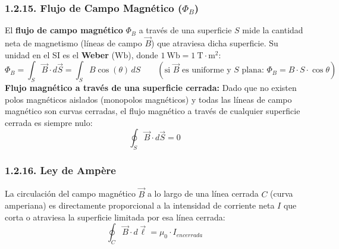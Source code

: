 \subsubsection{1.2.15. Flujo de Campo Magnético ($\Phi_B$)}
\begin{definicion}
El \textbf{flujo de campo magnético} $\Phi_B$ a través de una superficie $S$ mide la cantidad neta de magnetismo (líneas de campo $\vec{B}$) que atraviesa dicha superficie. Su unidad en el SI es el \textbf{Weber} ($\si{\weber}$), donde $1\ \si{\weber} = 1\ \si{\tesla\cdot\meter\squared}$:
\begin{equation}
    \Phi_B = \int_S \vec{B} \cdot d\vec{S} = \int_S B \cos(\theta)\, dS \qquad \left(\text{si }\vec{B}\text{ es uniforme y }S\text{ plana: }\Phi_B = B \cdot S \cdot \cos\theta\right)
\end{equation}
\textbf{Flujo magnético a través de una superficie cerrada:} Dado que no existen polos magnéticos aislados (monopolos magnéticos) y todas las líneas de campo magnético son curvas cerradas, el flujo magnético a través de cualquier superficie cerrada es siempre nulo:
\begin{equation}
    \boxed{\oint_S \vec{B} \cdot d\vec{S} = 0}
\end{equation}
\end{definicion}

\subsubsection{1.2.16. Ley de Ampère}
\begin{ley}
La circulación del campo magnético $\vec{B}$ a lo largo de una línea cerrada $C$ (curva amperiana) es directamente proporcional a la intensidad de corriente neta $I$ que corta o atraviesa la superficie limitada por esa línea cerrada:
\begin{equation}
    \oint_C \vec{B} \cdot d\vec{\ell} = \mu_0 \cdot I_{encerrada}
\end{equation}
\end{ley}

